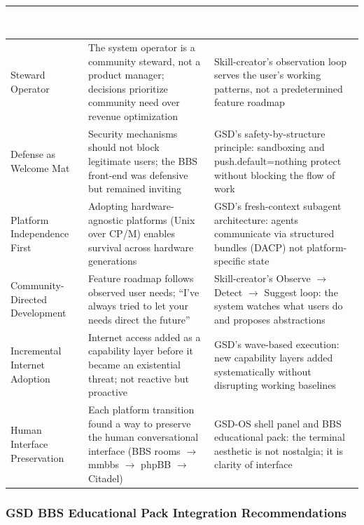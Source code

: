 \documentclass[11pt,letterpaper]{article}
\newcommand{\tableheader}[1]{\textbf{\sffamily\textcolor{white}{#1}}}
\begin{document}
\begin{center}
\begin{tabularx}{\textwidth}{L{3cm}L{5cm}X}
\toprule
{}
\tableheader{Pattern Name} & \tableheader{Definition} & \tableheader{GSD Mapping} \\
\midrule
Steward Operator & The system operator is a community steward, not a product manager; decisions prioritize community need over revenue optimization & Skill-creator's observation loop serves the user's working patterns, not a predetermined feature roadmap \\
Defense as Welcome Mat & Security mechanisms should not block legitimate users; the BBS front-end was defensive but remained inviting & GSD's safety-by-structure principle: sandboxing and push.default=nothing protect without blocking the flow of work \\
Platform Independence First & Adopting hardware-agnostic platforms (Unix over CP/M) enables survival across hardware generations & GSD's fresh-context subagent architecture: agents communicate via structured bundles (DACP) not platform-specific state \\
Community-Directed Development & Feature roadmap follows observed user needs; ``I've always tried to let your needs direct the future'' & Skill-creator's Observe $\rightarrow$ Detect $\rightarrow$ Suggest loop: the system watches what users do and proposes abstractions \\
Incremental Internet Adoption & Internet access added as a capability layer before it became an existential threat; not reactive but proactive & GSD's wave-based execution: new capability layers added systematically without disrupting working baselines \\
Human Interface Preservation & Each platform transition found a way to preserve the human conversational interface (BBS rooms $\rightarrow$ mmbbs $\rightarrow$ phpBB $\rightarrow$ Citadel) & GSD-OS shell panel and BBS educational pack: the terminal aesthetic is not nostalgia; it is clarity of interface \\
\bottomrule
\end{tabularx}
\end{center}

\subsubsection{GSD BBS Educational Pack Integration Recommendations}
\end{document}
